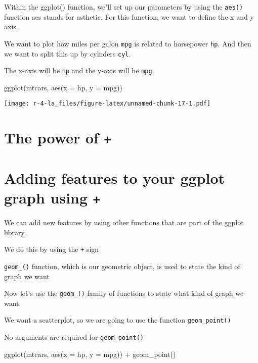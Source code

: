 \documentclass[
]{book}
\newenvironment{Shaded}{\begin{snugshade}}{\end{snugshade}}
\newcommand{\AttributeTok}[1]{\textcolor[rgb]{0.77,0.63,0.00}{#1}}
\newcommand{\FunctionTok}[1]{\textcolor[rgb]{0.00,0.00,0.00}{#1}}
\newcommand{\NormalTok}[1]{#1}
\newcommand{\SpecialCharTok}[1]{\textcolor[rgb]{0.00,0.00,0.00}{#1}}
\begin{document}
Within the ggplot() function, we'll set up our parameters by using the \texttt{aes()} function aes stands for asthetic. For this function, we want to define the x and y axis.

We want to plot how miles per galon \texttt{mpg} is related to horsepower \texttt{hp}. And then we want to split this up by cylnders \texttt{cyl}.

The x-axis will be \texttt{hp} and the y-axis will be \texttt{mpg}

\begin{Shaded}
\begin{Highlighting}[]
\FunctionTok{ggplot}\NormalTok{(mtcars, }\FunctionTok{aes}\NormalTok{(}\AttributeTok{x =}\NormalTok{ hp, }\AttributeTok{y =}\NormalTok{ mpg))}
\end{Highlighting}
\end{Shaded}

\texttt{[image: r-4-la\_files/figure-latex/unnamed-chunk-17-1.pdf]}

\hypertarget{the-power-of}{%
\section{\texorpdfstring{The power of \texttt{+}}{The power of +}}\label{the-power-of}}

\hypertarget{adding-features-to-your-ggplot-graph-using}{%
\section{\texorpdfstring{Adding features to your ggplot graph using \texttt{+}}{Adding features to your ggplot graph using +}}\label{adding-features-to-your-ggplot-graph-using}}

We can add new features by using other functions that are part of the ggplot library.

We do this by using the \texttt{+} sign

\texttt{geom\_()} function, which is our geometric object, is used to state the kind of graph we want

Now let's use the \texttt{geom\_()} family of functions to state what kind of graph we want.

We want a scatterplot, so we are going to use the function \texttt{geom\_point()}

No arguments are required for \texttt{geom\_point()}

\begin{Shaded}
\begin{Highlighting}[]
\FunctionTok{ggplot}\NormalTok{(mtcars, }\FunctionTok{aes}\NormalTok{(}\AttributeTok{x =}\NormalTok{ hp, }\AttributeTok{y =}\NormalTok{ mpg)) }\SpecialCharTok{+}
  \FunctionTok{geom\_point}\NormalTok{()}
\end{Highlighting}
\end{Shaded}
\end{document}
